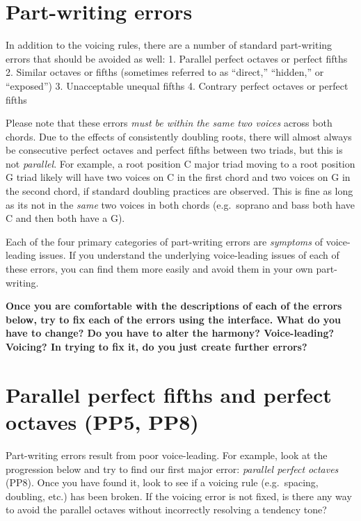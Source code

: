 \documentclass{book}
\begin{document}
\hypertarget{part-writing-errors}{%
\section{Part-writing errors}\label{part-writing-errors}}

In addition to the voicing rules, there are a number of standard part-writing
errors that should be avoided as well: 1. Parallel perfect octaves or perfect
fifths 2. Similar octaves or fifths (sometimes referred to as ``direct,''
``hidden,'' or ``exposed'') 3. Unacceptable unequal fifths 4. Contrary perfect
octaves or perfect fifths

Please note that these errors \emph{must be within the same two voices} across
both chords. Due to the effects of consistently doubling roots, there will
almost always be consecutive perfect octaves and perfect fifths between two
triads, but this is not \emph{parallel}. For example, a root position C major
triad moving to a root position G triad likely will have two voices on C in
the first chord and two voices on G in the second chord, if standard doubling
practices are observed. This is fine as long as its not in the \emph{same} two
voices in both chords (e.g.~soprano and bass both have C and then both have a
G).

Each of the four primary categories of part-writing errors are \emph{symptoms}
of voice-leading issues. If you understand the underlying voice-leading issues
of each of these errors, you can find them more easily and avoid them in your
own part-writing.

\textbf{Once you are comfortable with the descriptions of each of the errors
below, try to fix each of the errors using the interface. What do you have to
change? Do you have to alter the harmony? Voice-leading? Voicing? In trying to
fix it, do you just create further errors?}

\hypertarget{parallel-perfect-fifths-and-perfect-octaves-pp5-pp8}{%
\section{Parallel perfect fifths and perfect octaves (PP5,
PP8)}\label{parallel-perfect-fifths-and-perfect-octaves-pp5-pp8}}

Part-writing errors result from poor voice-leading. For example, look at the
progression below and try to find our first major error: \emph{parallel
perfect octaves} (PP8). Once you have found it, look to see if a voicing rule
(e.g.~spacing, doubling, etc.) has been broken. If the voicing error is not
fixed, is there any way to avoid the parallel octaves without incorrectly
resolving a tendency tone?
\end{document}
